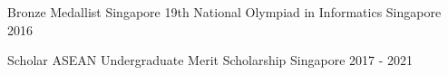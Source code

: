 



\begin{cvhonors}  
  \cvhonor
    {Bronze Medallist} %
    {Singapore 19th National Olympiad in Informatics} %
    {Singapore} %
    {2016} %
    
 \cvhonor
    {Scholar} %
    {ASEAN Undergraduate Merit Scholarship} %
    {Singapore} %
    {2017 - 2021} %

\end{cvhonors}
